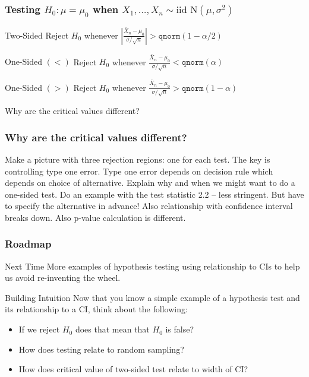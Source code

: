 \begin{frame}
  \frametitle{Testing $H_0\colon \mu = \mu_0$ when $X_1, \dots, X_n \sim \mbox{iid N}(\mu, \sigma^2)$}

  \begin{block}{Two-Sided}
    Reject $H_0$ whenever $\displaystyle \left|\frac{\bar{X}_n - \mu_0}{\sigma/\sqrt{n}}\right|> \texttt{qnorm}(1 - \alpha/2)$ 
  \end{block}

  \begin{block}{One-Sided $(<)$}
    Reject $H_0$ whenever $\displaystyle \frac{\bar{X}_n - \mu_0}{\sigma/\sqrt{n}} < \texttt{qnorm}(\alpha)$ 
  \end{block}

  \begin{block}{One-Sided $(>)$}
    Reject $H_0$ whenever $\displaystyle \frac{\bar{X}_n - \mu_0}{\sigma/\sqrt{n}} > \texttt{qnorm}(1 - \alpha)$ 
  \end{block}

  \vspace{1em}
  \alert{Why are the critical values different?}

\end{frame}
\begin{frame}
  \frametitle{Why are the critical values different?}
  Make a picture with three rejection regions: one for each test.
  The key is controlling type one error.
  Type one error depends on decision rule which depends on choice of alternative.
  Explain why and when we might want to do a one-sided test.
  Do an example with the test statistic 2.2 -- less stringent.
  But have to specify the alternative in advance!
  Also relationship with confidence interval breaks down.
  Also p-value calculation is different.
\end{frame}
\begin{frame}
  \frametitle{Roadmap}

  \begin{block}{Next Time}
    More examples of hypothesis testing using relationship to CIs to help us avoid re-inventing the wheel.
  \end{block}


  \pause

  \begin{block}{Building Intuition}
   Now that you know a simple example of a hypothesis test and its relationship to a CI, think about the following:
   \begin{itemize}
     \item If we reject $H_0$ does that mean that $H_0$ is false?
     \item How does testing relate to random sampling?
      \item How does critical value of two-sided test relate to width of CI?
   \end{itemize}
  \end{block}

\end{frame}
